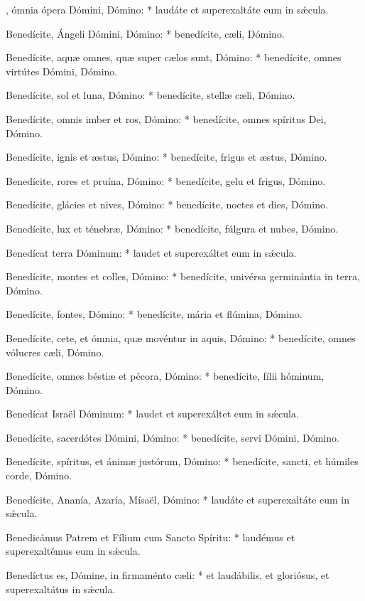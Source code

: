 \begin{psalmus}

, ómnia ópera Dómini, Dómino: * laudáte et superexaltáte eum in sǽcula.

Benedícite, Ángeli Dómini, Dómino: * benedícite, cæli, Dómino.

Benedícite, aquæ omnes, quæ super cælos sunt, Dómino: * benedícite, omnes virtútes Dómini, Dómino.

Benedícite, sol et luna, Dómino: * benedícite, stellæ cæli, Dómino.

Benedícite, omnis imber et ros, Dómino: * benedícite, omnes spíritus Dei, Dómino.

Benedícite, ignis et æstus, Dómino: * benedícite, frigus et æstus, Dómino.

Benedícite, rores et pruína, Dómino: * benedícite, gelu et frigus, Dómino.

Benedícite, glácies et nives, Dómino: * benedícite, noctes et dies, Dómino.

Benedícite, lux et ténebræ, Dómino: * benedícite, fúlgura et nubes, Dómino.

Benedícat terra Dóminum: * laudet et superexáltet eum in sǽcula.

Benedícite, montes et colles, Dómino: * benedícite, univérsa germinántia in terra, Dómino.

Benedícite, fontes, Dómino: * benedícite, mária et flúmina, Dómino.

Benedícite, cete, et ómnia, quæ movéntur in aquis, Dómino: * benedícite, omnes vólucres cæli, Dómino.

Benedícite, omnes béstiæ et pécora, Dómino: * benedícite, fílii hóminum, Dómino.

Benedícat Israël Dóminum: * laudet et superexáltet eum in sǽcula.

Benedícite, sacerdótes Dómini, Dómino: * benedícite, servi Dómini, Dómino.

Benedícite, spíritus, et ánimæ justórum, Dómino: * benedícite, sancti, et húmiles corde, Dómino.

Benedícite, Ananía, Azaría, Mísaël, Dómino: * laudáte et superexaltáte eum in sǽcula.

Benedicámus Patrem et Fílium cum Sancto Spíritu: * laudémus et superexaltémus eum in sǽcula.

Benedíctus es, Dómine, in firmaménto cæli: * et laudábilis, et gloriósus, et superexaltátus in sǽcula.


\end{psalmus}
